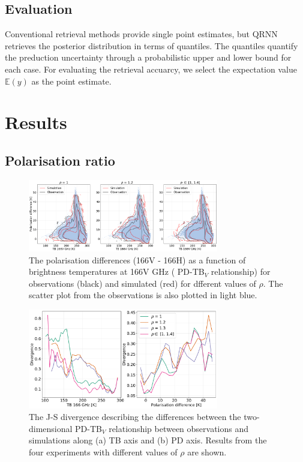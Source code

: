 \documentclass[amt, manuscript]{copernicus}
\begin{document}
\subsection{Evaluation}
\label{sec:evaluation}

Conventional retrieval methods provide single point estimates, but QRNN retrieves the posterior distribution in terms of quantiles. The quantiles quantify the preduction uncertainty through a probabilistic upper and lower bound for each case. For evaluating the retrieval accuarcy, we select the expectation value $\mathbb{E}(y)$ as the point estimate. 





\section{Results}

\subsection{Polarisation ratio}
\label{sec:polratio}
\begin{figure}[t]
	\includegraphics[width=8.3cm]{Figures/PD_166.png}
	\caption{The polarisation differences (166V - 166H) as a function of
		brightness temperatures at 166V GHz ( PD-TB$_V$ relationship) for observations (black) and simulated (red) for dfferent values of $\rho$. The scatter plot from the observations is also plotted in light blue.}
	\label{fig:PD_166}
\end{figure}
\begin{figure}[t]
	\includegraphics[width=8.3cm]{Figures/divergence.pdf}
	\caption{The J-S divergence describing the differences between the two-dimensional PD-TB$_V$ relationship between observations and simulations along (a) TB axis and (b) PD axis. Results from the four experiments with different values of $\rho$ are shown. }
	\label{fig:divergence_PD}
\end{figure}
\end{document}
